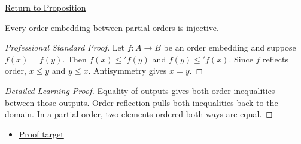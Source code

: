 \newpage
{}
\label{prf:order-embedding-injective-revisited}

\begin{remark*}[Return]
\hyperref[prop:order-embedding-injective-revisited]{Return to Proposition}
\end{remark*}

\begin{proposition*}
Every order embedding between partial orders is injective.
\end{proposition*}

\begin{proof}[Professional Standard Proof]
\LRAProofBodyStart
Let $f:A\to B$ be an order embedding and suppose $f(x)=f(y)$. Then
$f(x)\leq' f(y)$ and $f(y)\leq' f(x)$. Since $f$ reflects order,
$x\leq y$ and $y\leq x$. Antisymmetry gives $x=y$.
\end{proof}

\begin{proof}[Detailed Learning Proof]
\LRAProofBodyStart
Equality of outputs gives both order inequalities between those outputs.
Order-reflection pulls both inequalities back to the domain. In a partial
order, two elements ordered both ways are equal.
\end{proof}
\begin{remark*}
\end{remark*}



\begin{dependencies}
\begin{itemize}
  \item \hyperref[prop:order-embedding-injective-revisited]{Proof target}
\end{itemize}
\end{dependencies}

\clearpage

